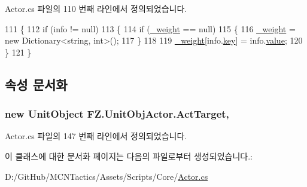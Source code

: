 Actor.\+cs 파일의 110 번째 라인에서 정의되었습니다.


\begin{DoxyCode}
111         \{
112             \textcolor{keywordflow}{if} (info != null)
113             \{
114                 \textcolor{keywordflow}{if} (\hyperlink{class_f_z_1_1_actor_a58087c82d2172b1edc4d6d7ec0786317}{\_weight} == null)
115                 \{
116                     \hyperlink{class_f_z_1_1_actor_a58087c82d2172b1edc4d6d7ec0786317}{\_weight} = \textcolor{keyword}{new} Dictionary<string, int>();
117                 \}
118 
119                 \hyperlink{class_f_z_1_1_actor_a58087c82d2172b1edc4d6d7ec0786317}{\_weight}[info.\hyperlink{class_f_z_1_1_pair_a36d4b7c90f0a247dff54da733701a53a}{key}] = info.\hyperlink{class_f_z_1_1_pair_a548bd4cfb4d1587016f1f53be6fac5b8}{value};
120             \}
121         \}
\end{DoxyCode}


\subsection{속성 문서화}
\subsubsection[{\texorpdfstring{Act\+Target}{ActTarget}}]{\setlength{\rightskip}{0pt plus 5cm}new {\bf Unit\+Object} F\+Z.\+Unit\+Obj\+Actor.\+Act\+Target\hspace{0.3cm}{\ttfamily [get]}, {\ttfamily [protected]}}\hypertarget{class_f_z_1_1_unit_obj_actor_a9343320a7b31731b88fa6ab91d649328}{}\label{class_f_z_1_1_unit_obj_actor_a9343320a7b31731b88fa6ab91d649328}


Actor.\+cs 파일의 147 번째 라인에서 정의되었습니다.



이 클래스에 대한 문서화 페이지는 다음의 파일로부터 생성되었습니다.\+:\begin{DoxyCompactItemize}
\item 
D\+:/\+Git\+Hub/\+M\+C\+N\+Tactics/\+Assets/\+Scripts/\+Core/\hyperlink{_actor_8cs}{Actor.\+cs}\end{DoxyCompactItemize}
